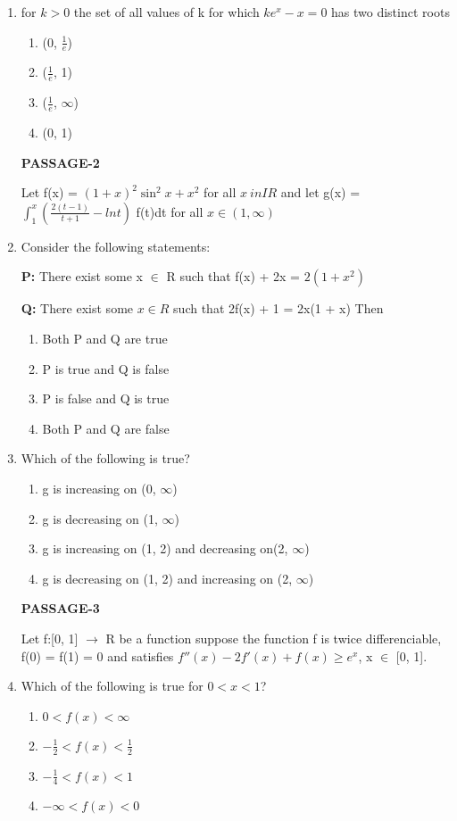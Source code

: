 \begin{enumerate}[label=\arabic*.,ref=\thesubsection.\theenumi]
\item for $k > 0$ the set of all values of k for which $ke^x - x = 0$ has two distinct roots
\begin{enumerate}
\item (0, $\frac{1}{e}$)
\item ($\frac{1}{e}$, 1)
\item ($\frac{1}{e}$, $\infty$)
\item (0, 1)
\end{enumerate}

\textbf{PASSAGE-2}

Let f(x) = $(1 + x)^2 \sin^2 x + x^2$ for all $x\ in IR$ and let g(x) = $\int_{1}^{x} (\frac{2(t - 1)}{t + 1} - lnt)$ f(t)dt for all $x \in (1,\infty)$

\item Consider the following statements:

\textbf{P:} There exist some x $\in$ R such that f(x) + 2x = $2(1 + x^2)$

\textbf{Q:} There exist some $x \in R$ such that 2f(x) + 1 = 2x(1 + x)
Then 
\begin{enumerate}
\item Both P and Q are true
\item P is true and Q is false
\item P is false and Q is true
\item Both P and Q are false
\end{enumerate}

\item Which of the following is true?
\begin{enumerate}
\item g is increasing on (0, $\infty$)
\item g is decreasing on (1, $\infty$)
\item g is increasing on (1, 2) and decreasing on(2, $\infty$)
\item g is decreasing on (1, 2) and increasing on (2, $\infty$)
\end{enumerate}

\textbf{PASSAGE-3}

Let f:[0, 1] $\to$ R be a function suppose the function f is twice differenciable, f(0) = f(1) = 0 and satisfies $f''(x) - 2f'(x) + f(x) \geq e^x$, x $\in$ [0, 1].

\item Which of the following is true for $0 < x < 1$?
\begin{enumerate}
\item $0 < f(x) < \infty$
\item $-\frac{1}{2} < f(x) < \frac{1}{2}$
\item $-\frac{1}{4} < f(x) < 1$
\item $-\infty < f(x) < 0$
\end{enumerate}


\end{enumerate}
